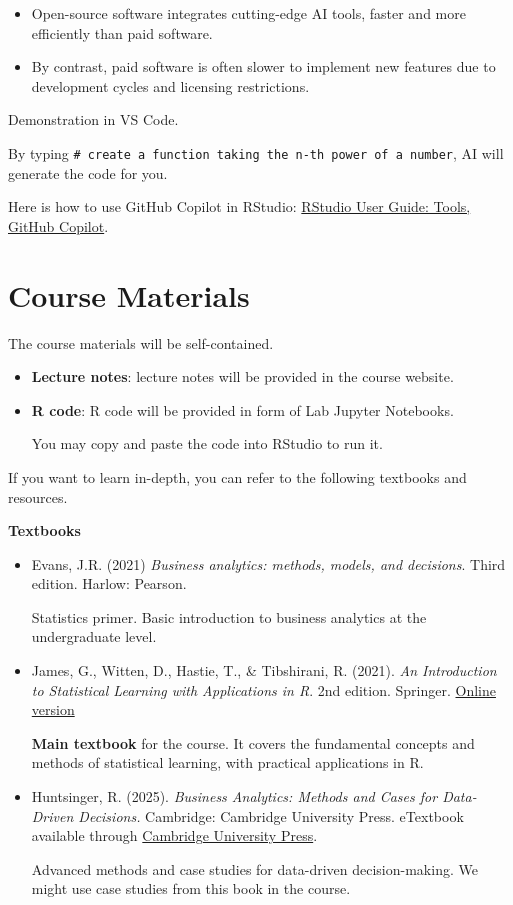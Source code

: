 \documentclass[
  12pt,
  letterpaper,
]{scrbook}
\providecommand{\tightlist}{%
  \setlength{\itemsep}{0pt}\setlength{\parskip}{0pt}}
\renewcommand{\tightlist}{\setlength{\itemsep}{0.5\baselineskip}\setlength{\parskip}{0.2\baselineskip}}
\theoremstyle{plain}
\theoremstyle{definition}
\theoremstyle{remark}
\begin{document}
\begin{itemize}
\tightlist
\item
  Open-source software integrates cutting-edge AI tools, faster and more
  efficiently than paid software.
\item
  By contrast, paid software is often slower to implement new features
  due to development cycles and licensing restrictions.
\end{itemize}

{ Demonstration in VS Code. }

By typing
\texttt{\#\ create\ a\ function\ taking\ the\ n-th\ power\ of\ a\ number},
AI will generate the code for you.

Here is how to use GitHub Copilot in RStudio:
\href{https://docs.posit.co/ide/user/ide/guide/tools/copilot.html\#using-copilot}{RStudio
User Guide: Tools, GitHub Copilot}.

\section{Course Materials}\label{course-materials}

The course materials will be self-contained.

\begin{itemize}
\item
  \textbf{Lecture notes}: lecture notes will be provided in the course
  website.
\item
  \textbf{R code}: R code will be provided in form of Lab Jupyter
  Notebooks.

  You may copy and paste the code into RStudio to run it.
\end{itemize}

If you want to learn in-depth, you can refer to the following textbooks
and resources.

\textbf{Textbooks}

\begin{itemize}
\item
  Evans, J.R. (2021) \emph{Business analytics: methods, models, and
  decisions}. Third edition. Harlow: Pearson.

  Statistics primer. Basic introduction to business analytics at the
  undergraduate level.
\item
  James, G., Witten, D., Hastie, T., \& Tibshirani, R. (2021). \emph{An
  Introduction to Statistical Learning with Applications in R}. 2nd
  edition. Springer. \href{https://www.statlearning.com/}{Online
  version}

  \textbf{Main textbook} for the course. It covers the fundamental
  concepts and methods of statistical learning, with practical
  applications in R.
\item
  Huntsinger, R. (2025). \emph{Business Analytics: Methods and Cases for
  Data-Driven Decisions.} Cambridge: Cambridge University Press.
  eTextbook available through
  \href{https://www.cambridge.org/highereducation/books/business-analytics/49F97FC7360294F70056ADDC895C61AE\#overview}{Cambridge
  University Press}.

  Advanced methods and case studies for data-driven decision-making. We
  might use case studies from this book in the course.
\end{itemize}
\end{document}
